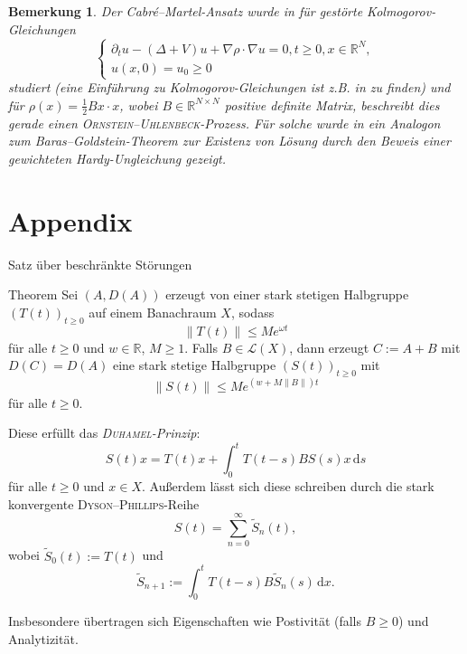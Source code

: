 \documentclass[handout]{beamer}
\theoremstyle{break}
\newtheorem{nt}[thm]{Bemerkung}
\begin{document}
\begin{frame}
\begin{nt}
Der Cabr\'e--Martel-Ansatz wurde in \cite{goldstein-rhandi} für gestörte Kolmogorov-Gleichungen
\begin{equation}%
\begin{cases}
\partial_t u - (\Delta+V) u +\nabla \rho \cdot \nabla u=0, t\ge 0, x\in \mathbb R^N,\\
u(x,0)=u_0 \ge 0
\end{cases}
\end{equation}
studiert (eine Einführung zu Kolmogorov-Gleichungen ist z.B. in \cite{lorenzi} zu finden) und für $\rho(x)=\frac{1}{2} Bx\cdot x$, wobei $B\in \mathbb R^{N\times N}$ positive definite Matrix, beschreibt dies gerade einen \textsc{Ornstein--Uhlenbeck}-Prozess.  Für solche wurde in \cite{goldstein-rhandi} ein Analogon zum Baras--Goldstein-Theorem zur Existenz von Lösung durch den Beweis einer gewichteten Hardy-Ungleichung gezeigt.
\end{nt}
\end{frame}

\section{Appendix}
\begin{frame}[allowframebreaks]{Satz über beschränkte Störungen}
\begin{block}{Theorem}
Sei $(A, D(A))$ erzeugt von einer stark stetigen Halbgruppe $(T(t))_{t\ge 0}$ auf einem Banachraum $X$, sodass
\begin{equation}
\|T(t)\|\le M e^{\omega t}
\end{equation}
f\"ur alle $t\ge 0$ und $w\in \mathbb R$, $M\ge 1$. Falls $B\in \mathcal L(X)$, dann erzeugt $C:=A+B$ mit $D(C)=D(A)$ eine stark stetige Halbgruppe $(S(t))_{t\ge 0}$ mit
\begin{equation}
\|S(t)\|\le M e^{(w+ M\|B\|) t}
\end{equation}
f\"ur alle $t\ge 0$. 
\end{block}
\begin{block}{}
Diese erf\"ullt das \emph{\textsc{Duhamel}-Prinzip}:
\begin{equation}\label{duhamel}
S(t) x = T(t) x + \int_0^t T(t-s) B S(s) x \,\mathrm ds
\end{equation}
f\"ur alle $t\ge 0$ und $x\in X$. 
Außerdem lässt sich diese schreiben durch die stark konvergente \textsc{Dyson--Phillips}-Reihe
\begin{equation}
S(t)=\sum_{n=0}^\infty \tilde S_n(t),
\end{equation}
wobei $\tilde S_0(t):=T(t)$ und
\begin{equation}
\tilde S_{n+1} := \int_0^t T(t-s) B\tilde S_n(s)\, \mathrm dx.
\end{equation}

Insbesondere \"ubertragen sich Eigenschaften wie Postivit\"at (falls $B\ge 0$) und Analytizit\"at.
\end{block}

\end{frame}
\end{document}
